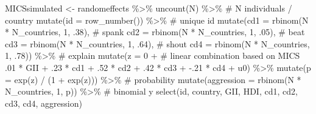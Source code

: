 \documentclass[
  letterpaper,
  DIV=11,
  numbers=noendperiod]{scrreprt}
\newenvironment{Shaded}{\begin{snugshade}}{\end{snugshade}}
\newcommand{\AttributeTok}[1]{\textcolor[rgb]{0.40,0.45,0.13}{#1}}
\newcommand{\CommentTok}[1]{\textcolor[rgb]{0.37,0.37,0.37}{#1}}
\newcommand{\DecValTok}[1]{\textcolor[rgb]{0.68,0.00,0.00}{#1}}
\newcommand{\FunctionTok}[1]{\textcolor[rgb]{0.28,0.35,0.67}{#1}}
\newcommand{\NormalTok}[1]{\textcolor[rgb]{0.00,0.23,0.31}{#1}}
\newcommand{\OtherTok}[1]{\textcolor[rgb]{0.00,0.23,0.31}{#1}}
\newcommand{\SpecialCharTok}[1]{\textcolor[rgb]{0.37,0.37,0.37}{#1}}
\begin{document}
\begin{Shaded}
\begin{Highlighting}[]
\NormalTok{MICSsimulated }\OtherTok{\textless{}{-}}\NormalTok{ randomeffects }\SpecialCharTok{\%\textgreater{}\%} 
  \FunctionTok{uncount}\NormalTok{(N) }\SpecialCharTok{\%\textgreater{}\%} \CommentTok{\# N individuals / country}
  \FunctionTok{mutate}\NormalTok{(}\AttributeTok{id =} \FunctionTok{row\_number}\NormalTok{()) }\SpecialCharTok{\%\textgreater{}\%} \CommentTok{\# unique id}
  \FunctionTok{mutate}\NormalTok{(}\AttributeTok{cd1 =} \FunctionTok{rbinom}\NormalTok{(N }\SpecialCharTok{*}\NormalTok{ N\_countries, }\DecValTok{1}\NormalTok{, .}\DecValTok{38}\NormalTok{), }\CommentTok{\# spank}
         \AttributeTok{cd2 =} \FunctionTok{rbinom}\NormalTok{(N }\SpecialCharTok{*}\NormalTok{ N\_countries, }\DecValTok{1}\NormalTok{, .}\DecValTok{05}\NormalTok{), }\CommentTok{\# beat}
         \AttributeTok{cd3 =} \FunctionTok{rbinom}\NormalTok{(N }\SpecialCharTok{*}\NormalTok{ N\_countries, }\DecValTok{1}\NormalTok{, .}\DecValTok{64}\NormalTok{), }\CommentTok{\# shout}
         \AttributeTok{cd4 =} \FunctionTok{rbinom}\NormalTok{(N }\SpecialCharTok{*}\NormalTok{ N\_countries, }\DecValTok{1}\NormalTok{, .}\DecValTok{78}\NormalTok{)) }\SpecialCharTok{\%\textgreater{}\%} \CommentTok{\# explain}
  \FunctionTok{mutate}\NormalTok{(}\AttributeTok{z =} \DecValTok{0} \SpecialCharTok{+} \CommentTok{\# linear combination based on MICS}
\NormalTok{           .}\DecValTok{01} \SpecialCharTok{*}\NormalTok{ GII }\SpecialCharTok{+}
\NormalTok{           .}\DecValTok{23} \SpecialCharTok{*}\NormalTok{ cd1 }\SpecialCharTok{+}
\NormalTok{           .}\DecValTok{52} \SpecialCharTok{*}\NormalTok{ cd2 }\SpecialCharTok{+}
\NormalTok{           .}\DecValTok{42} \SpecialCharTok{*}\NormalTok{ cd3 }\SpecialCharTok{+}
           \SpecialCharTok{{-}}\NormalTok{.}\DecValTok{21} \SpecialCharTok{*}\NormalTok{ cd4 }\SpecialCharTok{+} 
\NormalTok{           u0) }\SpecialCharTok{\%\textgreater{}\%}
  \FunctionTok{mutate}\NormalTok{(}\AttributeTok{p =} \FunctionTok{exp}\NormalTok{(z) }\SpecialCharTok{/}\NormalTok{ (}\DecValTok{1} \SpecialCharTok{+} \FunctionTok{exp}\NormalTok{(z))) }\SpecialCharTok{\%\textgreater{}\%} \CommentTok{\# probability}
  \FunctionTok{mutate}\NormalTok{(}\AttributeTok{aggression =} \FunctionTok{rbinom}\NormalTok{(N }\SpecialCharTok{*}\NormalTok{ N\_countries, }\DecValTok{1}\NormalTok{, p)) }\SpecialCharTok{\%\textgreater{}\%} \CommentTok{\# binomial y}
  \FunctionTok{select}\NormalTok{(id, country, GII, HDI,}
\NormalTok{         cd1, cd2, cd3, cd4, }
\NormalTok{         aggression)}
\end{Highlighting}
\end{Shaded}
\end{document}
